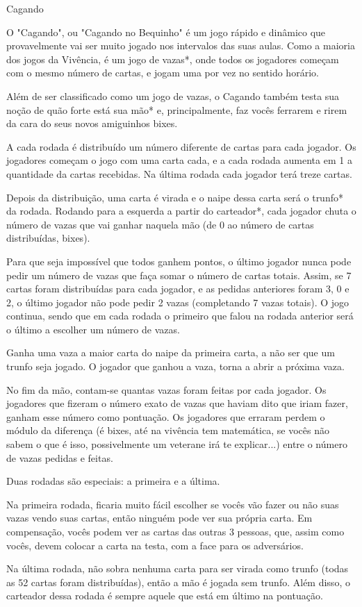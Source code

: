 \begin{subsecao}{Cagando}

O "Cagando", ou "Cagando no Bequinho" é um jogo rápido e dinâmico que
provavelmente vai ser muito jogado nos intervalos das suas aulas. Como a maioria
dos jogos da Vivência, é um jogo de vazas*, onde todos os jogadores começam com
o mesmo número de cartas, e jogam uma por vez no sentido horário.

Além de ser classificado como um jogo de vazas, o Cagando também testa sua noção
de quão forte está sua mão* e, principalmente, faz vocês ferrarem e rirem da
cara do seus novos amiguinhos bixes.

A cada rodada é distribuído um número diferente de cartas para cada jogador. Os
jogadores começam o jogo com uma carta cada, e a cada rodada aumenta em 1 a
quantidade da cartas recebidas. Na última rodada cada jogador terá treze cartas.

Depois da distribuição, uma carta é virada e o naipe dessa carta será o trunfo*
da rodada. Rodando para a esquerda a partir do carteador*, cada jogador chuta o
número de vazas que vai ganhar naquela mão (de 0 ao número de cartas
distribuídas, bixes).

Para que seja impossível que todos ganhem pontos, o último jogador nunca pode
pedir um número de vazas que faça somar o número de cartas totais. Assim, se 7
cartas foram distribuídas para cada jogador, e as pedidas anteriores foram 3, 0
e 2, o último jogador não pode pedir 2 vazas (completando 7 vazas totais). O
jogo continua, sendo que em cada rodada o primeiro que falou na rodada anterior
será o último a escolher um número de vazas. 

Ganha uma vaza a maior carta do naipe da primeira carta, a não ser que um
trunfo seja jogado. O jogador que ganhou a vaza, torna a abrir a próxima vaza. 

No fim da mão, contam-se quantas vazas foram feitas por cada
jogador. Os jogadores que fizeram o número exato de vazas que haviam
dito que iriam fazer, ganham esse número como pontuação. Os jogadores
que erraram perdem o módulo da diferença (é bixes, até na vivência tem
matemática, se vocês não sabem o que é isso, possivelmente um veterane
irá te explicar...) entre o número de vazas pedidas e feitas.

Duas rodadas são especiais: a primeira e a última. 

Na primeira rodada, ficaria muito fácil escolher se vocês vão fazer ou não suas
vazas vendo suas cartas, então ninguém pode ver sua própria carta. Em
compensação, vocês podem ver as cartas das outras 3 pessoas, que, assim como
vocês, devem colocar a carta na testa, com a face para os adversários.

Na última rodada, não sobra nenhuma carta para ser virada como trunfo (todas
as 52 cartas foram distribuídas), então a mão é jogada sem trunfo. Além disso,
o carteador dessa rodada é sempre aquele que está em último na pontuação.

\end{subsecao}
